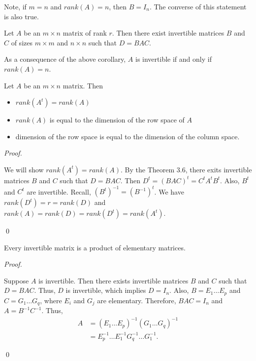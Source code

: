 \documentclass[12pt]{article}
\newenvironment{corollary}[2][Corollary]{\begin{trivlist}
\item[\hskip \labelsep {\bfseries #1}\hskip \labelsep {\bfseries #2}]}{\end{trivlist}}
\newenvironment{sol}
    {\emph{Proof.}
    }
    {
    \qed
    }
\begin{document}
Note, if $m = n$ and $rank(A) = n$, then $B = I_n$. The converse of this statement is also true.

\begin{corollary}{7}
Let $A$ be an $m \times n$ matrix of rank $r$. Then there exist invertible matrices $B$ and $C$ of sizes $m \times m$ and $n \times n$ such that $D = BAC$. 
\end{corollary}

As a consequence of the above corollary, $A$ is invertible if and only if $rank(A) = n$.

\begin{corollary}{8}
Let $A$ be an $m \times n$ matrix. Then 

\begin{itemize}
    \item $rank(A^t) = rank(A)$
    
    \item $rank(A)$ is equal to the dimension of the row space of $A$
    
    \item dimension of the row space is equal to the dimension of the column space.
\end{itemize}
\end{corollary}

\begin{sol}
We will show $rank(A^t) = rank(A)$. By the Theorem 3.6, there exits invertible matrices $B$ and $C$ such that $D = BAC$. Then $D^t = (BAC)^t = C^tA^tB^t$. Also, $B^t$ and $C^t$ are invertible. Recall, $(B^t)^{-1} = (B^{-1})^t$. We have $rank(D^t) = r = rank(D)$ and $rank(A) = rank(D) = rank(D^t) = rank(A^t)$. 
\end{sol}

\begin{corollary}{9}
Every invertible matrix is a product of elementary matrices.
\end{corollary}

\begin{sol}
Suppose $A$ is invertible. Then there exists invertible matrices $B$ and $C$ such that $D = BAC$. Thus, $D$ is invertible, which implies $D = I_n$. Also, $B = E_1 \dots E_p$ and $C = G_1 \dots G_q$, where $E_i$ and $G_j$ are elementary. Therefore, $BAC = I_n$ and $A = B^{-1}C^{-1}$. Thus, \begin{align*}
    A &= (E_1 \dots E_p)^{-1}(G_1 \dots G_q)^{-1} \\
    &= E_p^{-1} \dots E_1^{-1} G_q^{-1} \dots G_1^{-1}.
\end{align*}
\end{sol}
\end{document}
